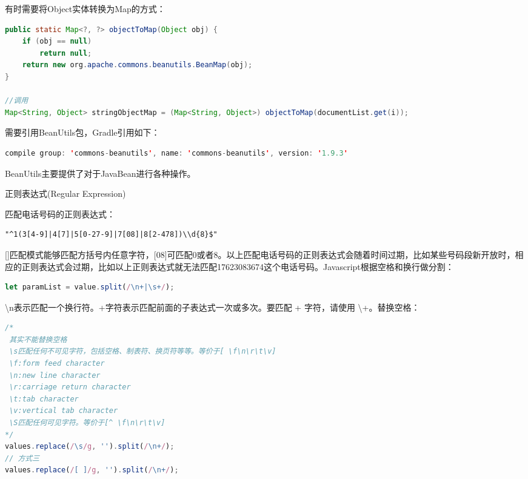 \documentclass[12pt]{book}
\makeatletter
\numberwithin{dummy}{section}
\theoremstyle{ocrenumbox}
\theoremstyle{blacknumex}
\theoremstyle{blacknumbox}
\theoremstyle{ocrenum}
\renewcommand{\subsection}{\@startsection {subsection}{2}{\z@}
	{-3ex \@plus -0.1ex \@minus -.4ex}
	{0.5ex \@plus.2ex }
	{\normalfont\sffamily\bfseries}}
\makeatother
\begin{document}
有时需要将Object实体转换为Map的方式：

\begin{lstlisting}[language=Java]
public static Map<?, ?> objectToMap(Object obj) {
	if (obj == null)
		return null;
	return new org.apache.commons.beanutils.BeanMap(obj);
}

//调用
Map<String, Object> stringObjectMap = (Map<String, Object>) objectToMap(documentList.get(i));
\end{lstlisting}

需要引用BeanUtils包，Gradle引用如下：

\begin{lstlisting}[language=Java]
compile group: 'commons-beanutils', name: 'commons-beanutils', version: '1.9.3'
\end{lstlisting}

BeanUtils主要提供了对于JavaBean进行各种操作。

\subsection{正则表达式(Regular Expression)}

匹配电话号码的正则表达式：

\begin{lstlisting}
"^1(3[4-9]|4[7]|5[0-27-9]|7[08]|8[2-478])\\d{8}$"
\end{lstlisting}

[]匹配模式能够匹配方括号内任意字符，[08]可匹配0或者8。以上匹配电话号码的正则表达式会随着时间过期，比如某些号码段新开放时，相应的正则表达式会过期，比如以上正则表达式就无法匹配17623083674这个电话号码。Javascript根据空格和换行做分割：

\begin{lstlisting}[language=Javascript]
let paramList = value.split(/\n+|\s+/);
\end{lstlisting}

\textbackslash{}n表示匹配一个换行符。+字符表示匹配前面的子表达式一次或多次。要匹配 + 字符，请使用 \textbackslash{}+。替换空格：

\begin{lstlisting}[language=Javascript]
/*
 其实不能替换空格
 \s匹配任何不可见字符，包括空格、制表符、换页符等等。等价于[ \f\n\r\t\v]
 \f:form feed character
 \n:new line character
 \r:carriage return character
 \t:tab character
 \v:vertical tab character
 \S匹配任何可见字符。等价于[^ \f\n\r\t\v]
*/
values.replace(/\s/g, '').split(/\n+/);
// 方式三
values.replace(/[ ]/g, '').split(/\n+/);
\end{lstlisting}
\end{document}
